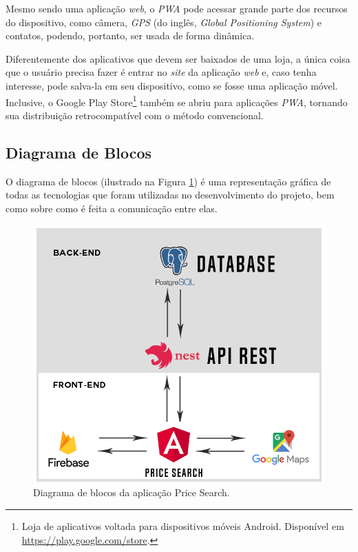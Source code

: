 Mesmo sendo uma aplicação \textit{web}, o \textit{PWA} pode acessar grande parte dos recursos do dispositivo, como câmera, \textit{GPS} (do inglês, \textit{Global Positioning System}) e contatos, podendo, portanto, ser usada de forma dinâmica.

Diferentemente dos aplicativos que devem ser baixados de uma loja, a única coisa que o usuário precisa fazer é entrar no \textit{site} da aplicação \textit{web} e, caso tenha interesse, pode salva-la em seu dispositivo, como se fosse uma aplicação móvel. Inclusive, o Google Play Store\footnote{Loja de aplicativos voltada para dispositivos móveis Android. Disponível em \url{https://play.google.com/store}.} também se abriu para aplicações \textit{PWA}, tornando sua distribuição retrocompatível com o método convencional.


\subsection{Diagrama de Blocos}

 O diagrama de blocos (ilustrado na Figura  \ref{fig:diagrama_de_blocos}) é uma representação gráfica de todas as tecnologias que foram utilizadas no desenvolvimento do projeto, bem como sobre como é feita a comunicação entre elas.
 
\begin{figure}[!htb]
\centering
\includegraphics[width=\linewidth]{figuras/diagrama_de_blocos.png}
\caption{Diagrama de blocos da aplicação Price Search.}
\label{fig:diagrama_de_blocos}
\end{figure}
 
